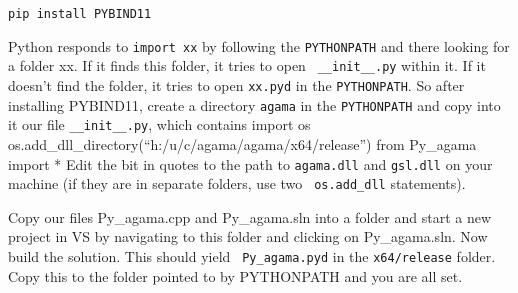 {\tt pip install PYBIND11

}\noindent
Python responds to {\tt import xx} by following the {\tt PYTHONPATH} and
there looking for a folder xx. If it finds this folder, it tries to open {\tt
\_\_init\_\_.py} within it. If it doesn't find the folder, it tries to open
{\tt xx.pyd} in the {\tt PYTHONPATH}. So after installing PYBIND11, create a
directory {\tt agama} in the {\tt PYTHONPATH} and copy into it our file 
{\tt \_\_init\_\_.py}, which contains
\begintt
import os
os.add_dll_directory(``h:/u/c/agama/agama/x64/release'')
from Py_agama import *
\endtt
Edit the bit in quotes to the path to {\tt agama.dll} and
{\tt gsl.dll} on your machine (if they are in separate folders, use two {\tt
os.add\_dll} statements).

Copy our files {Py\_agama.cpp} and {Py\_agama.sln} into a folder and start a
new project in VS by navigating to this folder and clicking on
{Py\_agama.sln}. Now build the solution. This should yield {\tt
Py\_agama.pyd} in the {\tt x64/release} folder. Copy this to the folder
pointed to by PYTHONPATH and you are all set.

\bsk
{}



\bye 